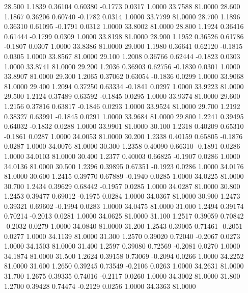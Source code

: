   28.500   1.1839   0.36104   0.60380  -0.1773   0.0317   1.0000  33.7588  81.0000
  28.600   1.1867   0.36206   0.60740  -0.1782   0.0314   1.0000  33.7799  81.0000
  28.700   1.1896   0.36310   0.61095  -0.1791   0.0312   1.0000  33.8002  81.0000
  28.800   1.1924   0.36416   0.61444  -0.1799   0.0309   1.0000  33.8198  81.0000
  28.900   1.1952   0.36526   0.61786  -0.1807   0.0307   1.0000  33.8386  81.0000
  29.000   1.1980   0.36641   0.62120  -0.1815   0.0305   1.0000  33.8567  81.0000
  29.100   1.2008   0.36766   0.62444  -0.1823   0.0303   1.0000  33.8741  81.0000
  29.200   1.2036   0.36903   0.62756  -0.1830   0.0301   1.0000  33.8907  81.0000
  29.300   1.2065   0.37062   0.63054  -0.1836   0.0299   1.0000  33.9068  81.0000
  29.400   1.2094   0.37250   0.63334  -0.1841   0.0297   1.0000  33.9223  81.0000
  29.500   1.2124   0.37489   0.63592  -0.1845   0.0295   1.0000  33.9374  81.0000
  29.600   1.2156   0.37816   0.63817  -0.1846   0.0293   1.0000  33.9524  81.0000
  29.700   1.2192   0.38327   0.63991  -0.1845   0.0291   1.0000  33.9684  81.0000
  29.800   1.2241   0.39495   0.64032  -0.1832   0.0288   1.0000  33.9901  81.0000
  30.100   1.2318   0.40209   0.65310  -0.1861   0.0287   1.0000  34.0053  81.0000
  30.200   1.2338   0.40159   0.65805  -0.1876   0.0287   1.0000  34.0076  81.0000
  30.300   1.2358   0.40090   0.66310  -0.1891   0.0286   1.0000  34.0103  81.0000
  30.400   1.2377   0.40003   0.66825  -0.1907   0.0286   1.0000  34.0136  81.0000
  30.500   1.2396   0.39895   0.67351  -0.1923   0.0286   1.0000  34.0176  81.0000
  30.600   1.2415   0.39770   0.67889  -0.1940   0.0285   1.0000  34.0225  81.0000
  30.700   1.2434   0.39629   0.68442  -0.1957   0.0285   1.0000  34.0287  81.0000
  30.800   1.2453   0.39477   0.69012  -0.1975   0.0284   1.0000  34.0367  81.0000
  30.900   1.2473   0.39321   0.69602  -0.1994   0.0283   1.0000  34.0475  81.0000
  31.000   1.2494   0.39174   0.70214  -0.2013   0.0281   1.0000  34.0625  81.0000
  31.100   1.2517   0.39059   0.70842  -0.2032   0.0279   1.0000  34.0840  81.0000
  31.200   1.2543   0.39005   0.71461  -0.2051   0.0277   1.0000  34.1139  81.0000
  31.300   1.2570   0.39020   0.72040  -0.2067   0.0273   1.0000  34.1503  81.0000
  31.400   1.2597   0.39080   0.72569  -0.2081   0.0270   1.0000  34.1874  81.0000
  31.500   1.2624   0.39158   0.73069  -0.2094   0.0266   1.0000  34.2252  81.0000
  31.600   1.2650   0.39245   0.73549  -0.2106   0.0263   1.0000  34.2631  81.0000
  31.700   1.2675   0.39335   0.74016  -0.2117   0.0260   1.0000  34.3002  81.0000
  31.800   1.2700   0.39428   0.74474  -0.2129   0.0256   1.0000  34.3363  81.0000
